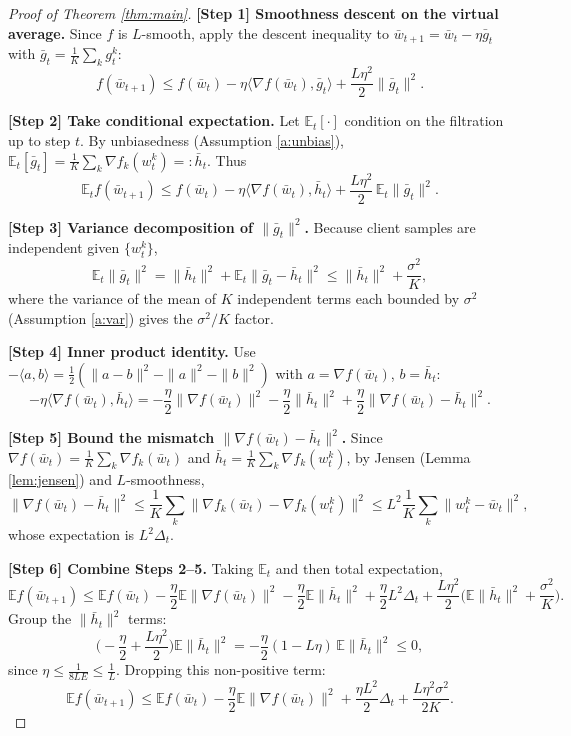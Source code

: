 \documentclass[11pt]{article}
\begin{document}
\begin{proof}[Proof of Theorem \ref{thm:main}]

\textbf{[Step 1] Smoothness descent on the virtual average.}
Since $f$ is $L$-smooth, apply the descent inequality to
$\bar w_{t+1} = \bar w_t - \eta \bar g_t$ with
$\bar g_t = \frac1K\sum_k g_t^k$:
\[
f(\bar w_{t+1})
\le f(\bar w_t)
 - \eta \langle \nabla f(\bar w_t), \bar g_t\rangle
 + \frac{L\eta^2}{2}\|\bar g_t\|^2.
\]

\textbf{[Step 2] Take conditional expectation.}
Let $\mathbb{E}_t[\cdot]$ condition on the filtration up to step $t$.
By unbiasedness (Assumption \ref{a:unbias}),
$\mathbb{E}_t[\bar g_t] = \frac1K\sum_k \nabla f_k(w_t^k) =: \bar h_t$. Thus
\[
\mathbb{E}_t f(\bar w_{t+1})
\le f(\bar w_t)
 - \eta \langle \nabla f(\bar w_t), \bar h_t\rangle
 + \frac{L\eta^2}{2}\,\mathbb{E}_t\|\bar g_t\|^2.
\]

\textbf{[Step 3] Variance decomposition of $\|\bar g_t\|^2$.}
Because client samples are independent given $\{w_t^k\}$,
\[
\mathbb{E}_t\|\bar g_t\|^2
= \|\bar h_t\|^2
 + \mathbb{E}_t\|\bar g_t - \bar h_t\|^2
\le \|\bar h_t\|^2 + \frac{\sigma^2}{K},
\]
where the variance of the mean of $K$ independent terms each bounded by
$\sigma^2$ (Assumption \ref{a:var}) gives the $\sigma^2/K$ factor.

\textbf{[Step 4] Inner product identity.}
Use $-\langle a, b\rangle = \tfrac12(\|a-b\|^2 - \|a\|^2 - \|b\|^2)$ with
$a=\nabla f(\bar w_t)$, $b=\bar h_t$:
\[
- \eta\langle \nabla f(\bar w_t), \bar h_t\rangle
= -\frac{\eta}{2}\|\nabla f(\bar w_t)\|^2
  -\frac{\eta}{2}\|\bar h_t\|^2
  +\frac{\eta}{2}\|\nabla f(\bar w_t) - \bar h_t\|^2.
\]

\textbf{[Step 5] Bound the mismatch $\|\nabla f(\bar w_t) - \bar h_t\|^2$.}
Since $\nabla f(\bar w_t) = \frac1K\sum_k \nabla f_k(\bar w_t)$ and
$\bar h_t = \frac1K\sum_k \nabla f_k(w_t^k)$, by Jensen
(Lemma \ref{lem:jensen}) and $L$-smoothness,
\[
\|\nabla f(\bar w_t) - \bar h_t\|^2
\le \frac1K\sum_k \|\nabla f_k(\bar w_t) - \nabla f_k(w_t^k)\|^2
\le L^2 \frac1K\sum_k \|w_t^k - \bar w_t\|^2 ,
\]
whose expectation is $L^2\Delta_t$.

\textbf{[Step 6] Combine Steps 2--5.}
Taking $\mathbb{E}_t$ and then total expectation,
\[
\mathbb{E} f(\bar w_{t+1})
\le \mathbb{E} f(\bar w_t)
 -\frac{\eta}{2}\mathbb{E}\|\nabla f(\bar w_t)\|^2
 -\frac{\eta}{2}\mathbb{E}\|\bar h_t\|^2
 +\frac{\eta}{2}L^2\Delta_t
 +\frac{L\eta^2}{2}\Big(\mathbb{E}\|\bar h_t\|^2 + \frac{\sigma^2}{K}\Big).
\]
Group the $\|\bar h_t\|^2$ terms:
\[
\Big(-\frac{\eta}{2} + \frac{L\eta^2}{2}\Big)\mathbb{E}\|\bar h_t\|^2
= -\frac{\eta}{2}(1 - L\eta)\,\mathbb{E}\|\bar h_t\|^2 \le 0,
\]
since $\eta \le \tfrac{1}{8LE} \le \tfrac{1}{L}$. Dropping this non-positive term:
\[
\mathbb{E} f(\bar w_{t+1})
\le \mathbb{E} f(\bar w_t)
 -\frac{\eta}{2}\mathbb{E}\|\nabla f(\bar w_t)\|^2
 +\frac{\eta L^2}{2}\Delta_t
 +\frac{L\eta^2 \sigma^2}{2K}.
\tag{6.2}
\]


\end{proof}
\end{document}

